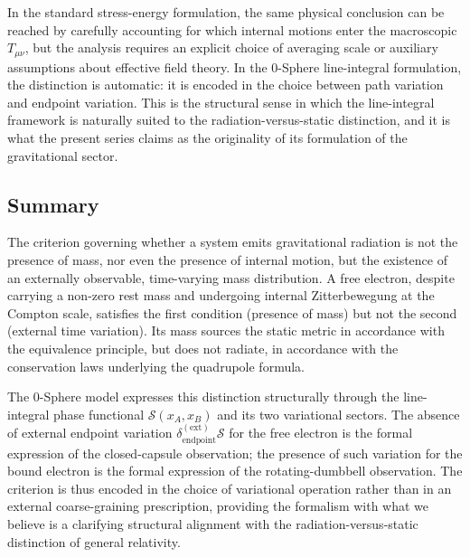 \documentclass[%
 reprint, amsmath,amssymb, aps, prd, ]{revtex4-2}
\numberwithin{equation}{section}
\begin{document}
In the standard stress-energy formulation, the same physical conclusion can be reached by carefully accounting for which internal motions enter the macroscopic $T_{\mu\nu}$, but the analysis requires an explicit choice of averaging scale or auxiliary assumptions about effective field theory.
In the 0-Sphere line-integral formulation, the distinction is automatic: it is encoded in the choice between path variation and endpoint variation.
This is the structural sense in which the line-integral framework is naturally suited to the radiation-versus-static distinction, and it is what the present series claims as the originality of its formulation of the gravitational sector.

\subsection{Summary}

The criterion governing whether a system emits gravitational radiation is not the presence of mass, nor even the presence of internal motion, but the existence of an externally observable, time-varying mass distribution.
A free electron, despite carrying a non-zero rest mass and undergoing internal Zitterbewegung at the Compton scale, satisfies the first condition (presence of mass) but not the second (external time variation).
Its mass sources the static metric in accordance with the equivalence principle, but does not radiate, in accordance with the conservation laws underlying the quadrupole formula.

The 0-Sphere model expresses this distinction structurally through the line-integral phase functional $\mathcal{S}(x_A, x_B)$ and its two variational sectors.
The absence of external endpoint variation $\delta_{\mathrm{endpoint}}^{(\mathrm{ext})}\mathcal{S}$ for the free electron is the formal expression of the closed-capsule observation; the presence of such variation for the bound electron is the formal expression of the rotating-dumbbell observation.
The criterion is thus encoded in the choice of variational operation rather than in an external coarse-graining prescription, providing the formalism with what we believe is a clarifying structural alignment with the radiation-versus-static distinction of general relativity.

\clearpage
\end{document}
